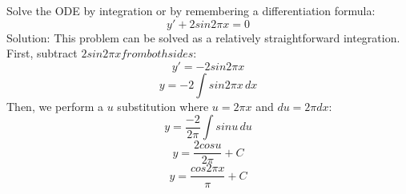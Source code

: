 \documentclass[12pt, letterpaper]{article}
\begin{document}
\setlength\parindent{0pt}
Solve the ODE by integration or by remembering a differentiation formula: 
\[ y' + 2sin2\pi x = 0 \]
Solution:
This problem can be solved as a relatively straightforward integration. First, subtract $2sin2\pi x from both sides:$
\[ y' = -2sin2\pi x \]
\[ y = -2\int{sin2\pi x}\,dx \]
Then, we perform a $u$ substitution where $u = 2\pi x$ and $du = 2\pi dx$:
\[ y = \frac{-2}{2\pi}\int{sinu}\,du \]
\[ y = \frac{2cosu}{2\pi} + C \]
\[ y = \frac{cos2\pi x}{\pi} + C \]
\end{document}
